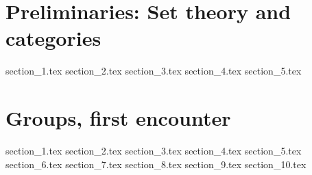 \documentclass{report}
\theoremstyle{definition}
\begin{document}
	\chapter{Preliminaries: Set theory and categories}
	{section_1.tex}
	{section_2.tex}
	{section_3.tex}
	{section_4.tex}
	{section_5.tex}
	
	\chapter{Groups, first encounter}	
	{section_1.tex}
	{section_2.tex}
	{section_3.tex}
	{section_4.tex}
	{section_5.tex}
	{section_6.tex}
	{section_7.tex}
	{section_8.tex}
	{section_9.tex}
	{section_10.tex}
	\printbibliography
\end{document}
